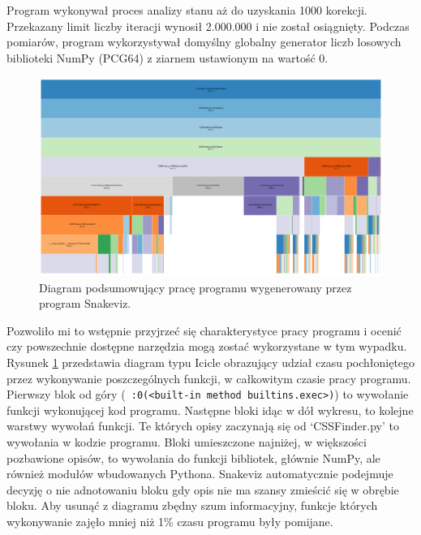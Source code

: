 \documentclass[11pt, a4paper]{article}
\newcommand{\code}[1]{\texttt{#1}}
\begin{document}
\begin{sloppypar}
    Program wykonywał proces analizy stanu aż do uzyskania 1000 korekcji. Przekazany limit
    liczby iteracji wynosił 2.000.000 i nie został osiągnięty. Podczas pomiarów, program
    wykorzystywał domyślny globalny generator liczb losowych biblioteki NumPy (PCG64\cite{NumpyDefaultGenerator})
    z ziarnem ustawionym na wartość 0.

    \FloatBarrier
    \begin{figure}[ht]
      \centering
      \includegraphics[width=1.0\textwidth]{"resources/profiling_1/graph.png"}
      \caption{Diagram podsumowujący pracę programu wygenerowany przez program Snakeviz.}
      \label{pre-prof-perf}
    \end{figure}
    \FloatBarrier

    Pozwoliło mi to wstępnie przyjrzeć się charakterystyce pracy programu i ocenić czy powszechnie
    dostępne narzędzia mogą zostać wykorzystane w tym wypadku. Rysunek
    \ref{pre-prof-perf} przedstawia diagram typu Icicle obrazujący udział czasu
    pochłoniętego przez wykonywanie poszczególnych funkcji, w całkowitym czasie pracy programu.
    Pierwszy blok od góry (\code{~:0(<built-in method builtins.exec>)}) to wywołanie funkcji
    wykonującej kod programu. Następne bloki idąc w dół wykresu, to kolejne warstwy wywołań
    funkcji. Te których opisy zaczynają się od `CSSFinder.py' to wywołania w kodzie
    programu. Bloki umieszczone najniżej, w większości pozbawione opisów, to wywołania do
    funkcji bibliotek, głównie NumPy, ale również modułów wbudowanych Pythona. Snakeviz
    automatycznie podejmuje decyzję o nie adnotowaniu bloku gdy opis nie ma szansy
    zmieścić się w obrębie bloku. Aby usunąć z diagramu zbędny szum informacyjny,
    funkcje których wykonywanie zajęło mniej niż 1\% czasu programu były pomijane.


\end{sloppypar}
\end{document}
